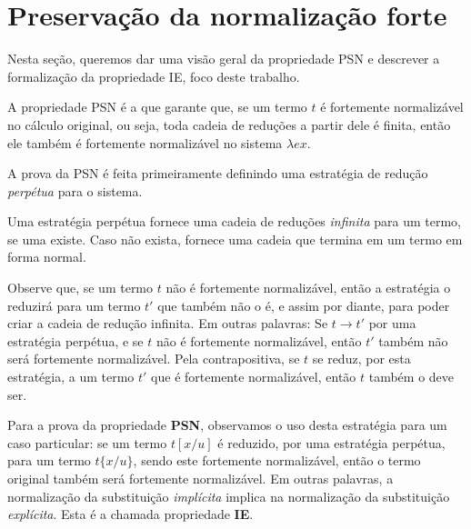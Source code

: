 


\section{Preservação da normalização forte}
\label{sec:psn}

Nesta seção, queremos dar uma visão geral da propriedade PSN e descrever a
formalização da propriedade IE, foco deste trabalho. 

A propriedade PSN é a que garante que, se um termo $t$ é fortemente
normalizável no cálculo original, ou seja, toda cadeia de reduções a partir dele
é finita, então ele também é fortemente normalizável no sistema $\lambda ex$.

A prova da PSN é feita primeiramente definindo uma estratégia de redução
\emph{perpétua} para o sistema.

\begin{definicao}
    Uma estratégia perpétua fornece uma cadeia de reduções \emph{infinita} para
    um termo, se uma existe. Caso não exista, fornece uma cadeia que termina em
    um termo em forma normal.
\end{definicao}

Observe que, se um termo $t$ não é fortemente normalizável, então a estratégia o
reduzirá para um termo $t'$ que também não o é, e assim por diante, para poder
criar a cadeia de redução infinita. Em outras palavras: Se $t \rightarrow t'$
por uma estratégia perpétua, e se $t$ não é fortemente normalizável, então $t'$
também não será fortemente normalizável.  Pela contrapositiva, se $t$ se reduz,
por esta estratégia, a um termo $t'$ que é fortemente normalizável, então $t$
também o deve ser.



Para a prova da propriedade \textbf{PSN}, observamos o uso desta estratégia para
um caso particular: se um termo $t[x/u]$ é reduzido, por uma estratégia
perpétua, para um termo $t\{x/u\}$, sendo este fortemente normalizável, então o
termo original também será fortemente normalizável. Em outras palavras, a
normalização da substituição \emph{implícita} implica na normalização da
substituição \emph{explícita}. Esta é a chamada propriedade \textbf{IE}.

